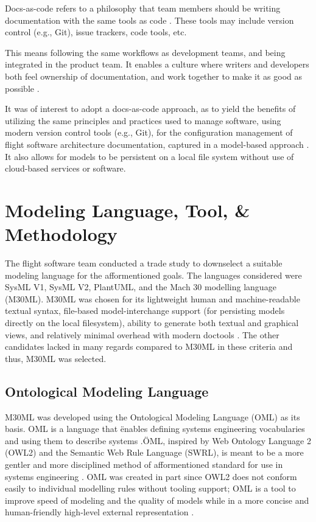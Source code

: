 \documentclass[conf]{new-aiaa}
\begin{document}
Docs-as-code refers to a philosophy that team members should be writing documentation with the same tools as code \cite{docs_as_code}.  These tools may include version control (e.g., Git), issue trackers, code tools, etc.

\begin{quoting}
    This means following the same workflows as development teams, and being integrated in the product team. It enables a culture where writers and developers both feel ownership of documentation, and work together to make it as good as possible \cite{docs_as_code}. 
\end{quoting}

It was of interest to adopt a docs-as-code approach, as to yield the benefits of utilizing the same principles and practices used to manage software, using modern version control tools (e.g., Git), for the configuration management of flight software architecture documentation, captured in a model-based approach \cite{docs_as_code}. It also allows for models to be persistent on a local file system without use of cloud-based services or software.


\section{Modeling Language, Tool, \& Methodology}

The flight software team conducted a trade study to downselect a suitable modeling language for the afformentioned goals. The languages considered were SysML V1, SysML V2, PlantUML, and the Mach 30 modelling language (M30ML). M30ML was chosen for its lightweight human and machine-readable textual syntax, file-based model-interchange support (for persisting models directly on the local filesystem), ability to generate both textual and graphical views, and relatively minimal overhead with modern doctools \cite{mach30_git}. The other candidates lacked in many regards compared to M30ML in these criteria and thus, M30ML was selected.

\subsection{Ontological Modeling Language}

M30ML was developed using the Ontological Modeling Language (OML) as its basis. OML is a language that \"enables defining systems engineering vocabularies and using them to describe systems \cite{oml_language}.\" OML, inspired by Web Ontology Language 2 (OWL2) and the Semantic Web Rule Language (SWRL), is meant to be a more gentler and more disciplined method of afformentioned standard for use in systems engineering \cite{oml_language}. OML was created in part since OWL2 does not conform easily to individual modelling rules without tooling support; OML is a tool to improve speed of modeling and the quality of models while in a more concise and human-friendly high-level external representation \cite{oml_origin_and_rationale}.
\end{document}
